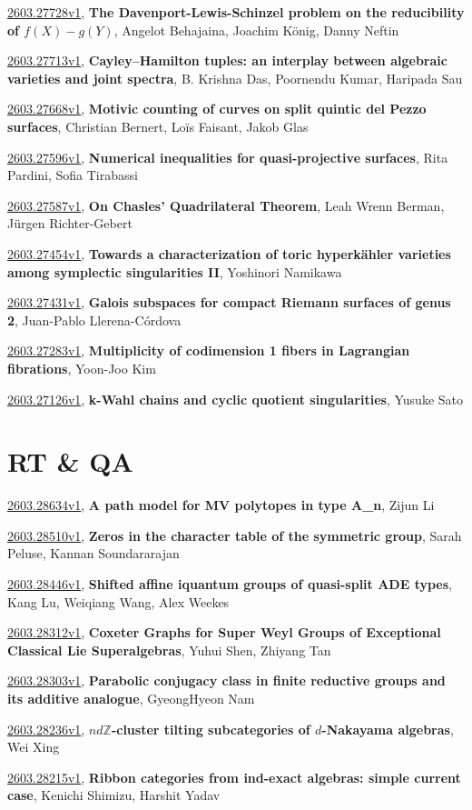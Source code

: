 \documentclass[9pt, a4paper]{article}
\theoremstyle{plain}
\theoremstyle{definition}
\theoremstyle{remark}
\newcommand{\arxiv}[3]{\href{https://arxiv.org/abs/#1}{#1}, \textbf{\textcolor{arxivblue}{#2}}, #3}
\begin{document}
\arxiv{2603.27728v1}{The Davenport-Lewis-Schinzel problem on the reducibility of $f(X)-g(Y)$}{Angelot Behajaina, Joachim König, Danny Neftin}

\arxiv{2603.27713v1}{Cayley--Hamilton tuples: an interplay between algebraic varieties and joint spectra}{B. Krishna Das, Poornendu Kumar, Haripada Sau}

\arxiv{2603.27668v1}{Motivic counting of curves on split quintic del Pezzo surfaces}{Christian Bernert, Loïs Faisant, Jakob Glas}

\arxiv{2603.27596v1}{Numerical inequalities for quasi-projective surfaces}{Rita Pardini, Sofia Tirabassi}

\arxiv{2603.27587v1}{On Chasles' Quadrilateral Theorem}{Leah Wrenn Berman, Jürgen Richter-Gebert}

\arxiv{2603.27454v1}{Towards a characterization of toric hyperkähler varieties among symplectic singularities II}{Yoshinori Namikawa}

\arxiv{2603.27431v1}{Galois subspaces for compact Riemann surfaces of genus 2}{Juan-Pablo Llerena-Córdova}

\arxiv{2603.27283v1}{Multiplicity of codimension 1 fibers in Lagrangian fibrations}{Yoon-Joo Kim}

\arxiv{2603.27126v1}{k-Wahl chains and cyclic quotient singularities}{Yusuke Sato}


\section{RT \& QA}
\arxiv{2603.28634v1}{A path model for MV polytopes in type A_n}{Zijun Li}

\arxiv{2603.28510v1}{Zeros in the character table of the symmetric group}{Sarah Peluse, Kannan Soundararajan}

\arxiv{2603.28446v1}{Shifted affine iquantum groups of quasi-split ADE types}{Kang Lu, Weiqiang Wang, Alex Weekes}

\arxiv{2603.28312v1}{Coxeter Graphs for Super Weyl Groups of Exceptional Classical Lie Superalgebras}{Yuhui Shen, Zhiyang Tan}

\arxiv{2603.28303v1}{Parabolic conjugacy class in finite reductive groups and its additive analogue}{GyeongHyeon Nam}

\arxiv{2603.28236v1}{$nd\mathbb{Z}$-cluster tilting subcategories of $d$-Nakayama algebras}{Wei Xing}

\arxiv{2603.28215v1}{Ribbon categories from ind-exact algebras: simple current case}{Kenichi Shimizu, Harshit Yadav}
\end{document}
